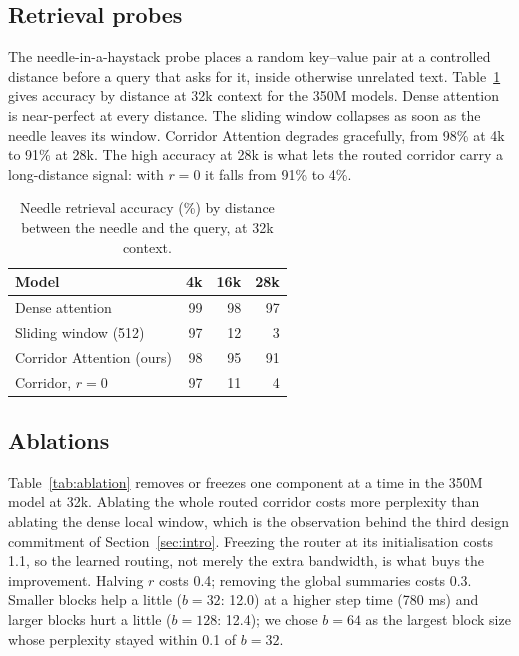 

\subsection{Retrieval probes}\label{sec:probes}

The needle-in-a-haystack probe places a random key--value pair at a
controlled distance before a query that asks for it, inside otherwise
unrelated text. Table~\ref{tab:needle} gives accuracy by distance at 32k
context for the 350M models. Dense attention is near-perfect at every
distance. The sliding window collapses as soon as the needle leaves its
window. Corridor Attention degrades gracefully, from 98\% at 4k to 91\% at
28k. The high accuracy at 28k is what lets the routed corridor carry a
long-distance signal: with $r = 0$ it falls from 91\% to 4\%.

\begin{table}[t]
  \centering
  \begin{tabular}{lrrr}
    \toprule
    Model & 4k & 16k & 28k \\
    \midrule
    Dense attention           & 99 & 98 & 97 \\
    Sliding window (512)      & 97 & 12 &  3 \\
    Corridor Attention (ours) & 98 & 95 & 91 \\
    Corridor, $r = 0$         & 97 & 11 &  4 \\
    \bottomrule
  \end{tabular}
  \caption{Needle retrieval accuracy (\%) by distance between the needle and
    the query, at 32k context.}
  \label{tab:needle}
\end{table}

\subsection{Ablations}\label{sec:ablations}

Table~\ref{tab:ablation} removes or freezes one component at a time in the
350M model at 32k. Ablating the whole routed corridor costs more perplexity
than ablating the dense local window, which is the observation behind the
third design commitment of Section~\ref{sec:intro}.
Freezing the router at its initialisation costs 1.1, so the learned routing,
not merely the extra bandwidth, is what buys the improvement. Halving $r$
costs 0.4; removing the global summaries costs 0.3. Smaller blocks help a
little ($b = 32$: 12.0) at a higher step time (780 ms) and larger blocks
hurt a little ($b = 128$: 12.4); we chose $b = 64$ as the largest block size
whose perplexity stayed within 0.1 of $b = 32$.

